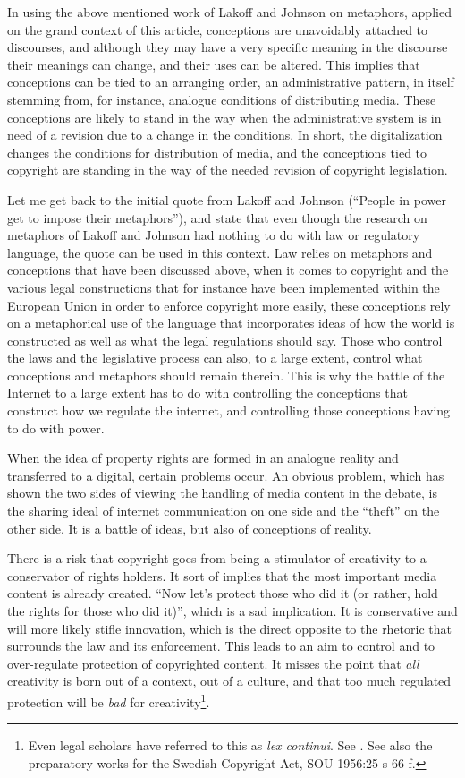 In using the above mentioned work of Lakof\hbox{}f and Johnson on metaphors, applied on
the grand context of this article, conceptions are unavoidably attached to
discourses, and although they may have a very specif\hbox{}ic meaning in the discourse
their meanings can change, and their uses can be altered. This implies that
conceptions can be tied to an arranging order, an administrative pattern, in
itself stemming from, for instance, analogue conditions of distributing media.
These conceptions are likely to stand in the way when the administrative system
is in need of a revision due to a change in the conditions. In short, the
digitalization changes the conditions for distribution of media, and the
conceptions tied to copyright are standing in the way of the needed revision of
copyright legislation.

Let me get back to the initial quote from Lakof\hbox{}f and Johnson (``People in power
get to impose their metaphors''\cite{darling-lakoff_johnson80}), and state that
even though the research on metaphors of Lakof\hbox{}f and Johnson had nothing to do
with law or regulatory language, the quote can be used in this context. Law
relies on metaphors and conceptions that have been discussed above, when it
comes to copyright and the various legal constructions that for instance have
been implemented within the European Union in order to enforce copyright more
easily, these conceptions rely on a metaphorical use of the language that
incorporates ideas of how the world is constructed as well as what the legal
regulations should say. Those who control the laws and the legislative process
can also, to a large extent, control what conceptions and metaphors should
remain therein.  This is why the battle of the Internet to a large extent has to
do with controlling the conceptions that construct how we regulate the internet,
and controlling those conceptions having to do with power. 

When the idea of property rights are formed in an analogue reality and
transferred to a digital, certain problems occur. An obvious problem, which has
shown the two sides of viewing the handling of media content in the debate, is
the sharing ideal of internet communication on one side and the ``theft'' on the
other side. It is a battle of ideas, but also of conceptions of reality. 

There is a risk that copyright goes from being a stimulator of creativity to a
conservator of rights holders. It sort of implies that the most important media
content is already created. ``Now let's protect those who did it (or rather,
hold the rights for those who did it)'', which is a sad implication. It is
conservative and will more likely stif\hbox{}le innovation, which is the direct
opposite to the rhetoric that surrounds the law and its enforcement. This leads
to an aim to control and to over-regulate protection of copyrighted content. It
misses the point that \textit{all} creativity is born out of a context, out of a
culture, and that too much regulated protection will be \textit{bad} for
creativity\footnote{Even legal scholars have referred to this as \textit{lex
continui}. See \cite{darling-karnell70}. See also the preparatory works for the
Swedish Copyright Act, SOU 1956:25 s 66 f.}.

